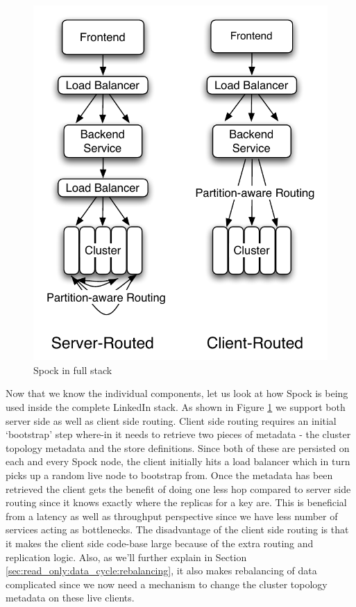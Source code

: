 \documentclass[twocolumn]{article}
\newcommand{\projectname}{Spock}
\begin{document}
\begin{figure}
  \centering
    \includegraphics[scale=0.60]{images/fullstack.pdf}
  \caption{\projectname{} in full stack}
  \label{fullstack}
\end{figure}


\noindent 
Now that we know the individual components, let us look at how \projectname{} is being used inside the complete LinkedIn stack. As shown in Figure \ref{fullstack} we support both server side as well as client side routing. Client side routing requires an initial `bootstrap' step where-in it needs to retrieve two pieces of metadata - the cluster topology metadata and the store definitions. Since both of these are persisted on each and every \projectname{} node, the client initially hits a load balancer which in turn picks up a random live node to bootstrap from. Once the metadata has been retrieved the client gets the benefit of doing one less hop compared to server side routing since it knows exactly where the replicas for a key are. This is beneficial from a latency as well as throughput perspective since we have less number of services acting as bottlenecks. The disadvantage of the client side routing is that it makes the client side code-base large because of the extra routing and replication logic. Also, as we'll further explain in Section \ref{sec:read_only:data_cycle:rebalancing}, it also makes rebalancing of data complicated since we now need a mechanism to change the cluster topology metadata on these live clients. 
\end{document}
